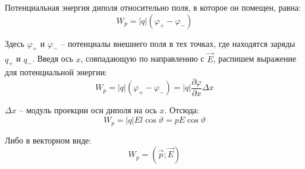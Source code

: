 \documentclass{article}
\begin{document}
	Потенциальная энергия диполя относительно поля, в которое он помещен, равна:
	\begin{equation}
		W_p = |q|(\varphi_+ - \varphi_-)
	\end{equation}

	Здесь $\varphi_+$ и $\varphi_-$ -- потенциалы внешнего поля в тех точках, где находятся заряды $q_+$ и $q_-$. Введя ось $x$, совпадающую по направлению с $\vec E$, распишем выражение для потенциальной энергии:
	\begin{equation}
		W_p = |q|(\varphi_+ - \varphi_-) = |q|\frac{\partial\varphi}{\partial x}\Delta x
	\end{equation}

	$\Delta x$ -- модуль проекции оси диполя на ось $x$. Отсюда:
	\begin{equation}
		W_p = |q|El\cos\vartheta = pE\cos\vartheta
	\end{equation}

	Либо в векторном виде:
	\begin{equation}
		W_p = (\vec p;\vec E)
	\end{equation}
\end{document}
